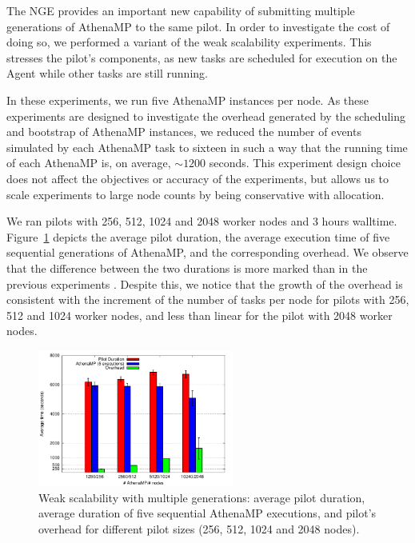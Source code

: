 The NGE provides an important new capability of submitting multiple
generations of AthenaMP to the same pilot. In order to investigate the cost of
doing so, we performed a variant of the weak scalability experiments. This
stresses the pilot's components, as new tasks are scheduled for execution on
the Agent while other tasks are still running.


In these experiments, we run five AthenaMP instances per node.  As these
experiments are designed to investigate the overhead generated by the
scheduling and bootstrap of AthenaMP instances, we reduced the number of
events simulated by each AthenaMP task to sixteen in such a way that the
running time of each AthenaMP is, on average, $\sim 1200$ seconds. This
experiment design choice does not affect the  objectives or accuracy of the
experiments, but allows us to scale experiments to large node counts by being
conservative with allocation.


We ran
pilots
with 256, 512, 1024 and 2048 worker nodes and
3 hours walltime. Figure~\ref{fig:weakScal2a} depicts the average
pilot duration, the average execution time of five sequential
generations of AthenaMP, and the corresponding overhead. We
observe that the difference between the two durations is more marked than in the
previous experiments . Despite this, we notice that the growth of the overhead is consistent with the increment of the number of tasks per node for pilots with 256, 512 and 1024 worker nodes, and less than linear for the pilot with 2048 worker nodes.

\begin{figure}[!htb]
        \includegraphics[height=4.5cm,width=\columnwidth]{./figures/NGE/weak2.pdf}
    \caption{Weak scalability with multiple generations: average pilot
    duration, average duration of five sequential AthenaMP executions, and
    pilot's overhead for different pilot sizes (256, 512, 1024 and 2048 nodes).}
\label{fig:weakScal2a}
\end{figure}

